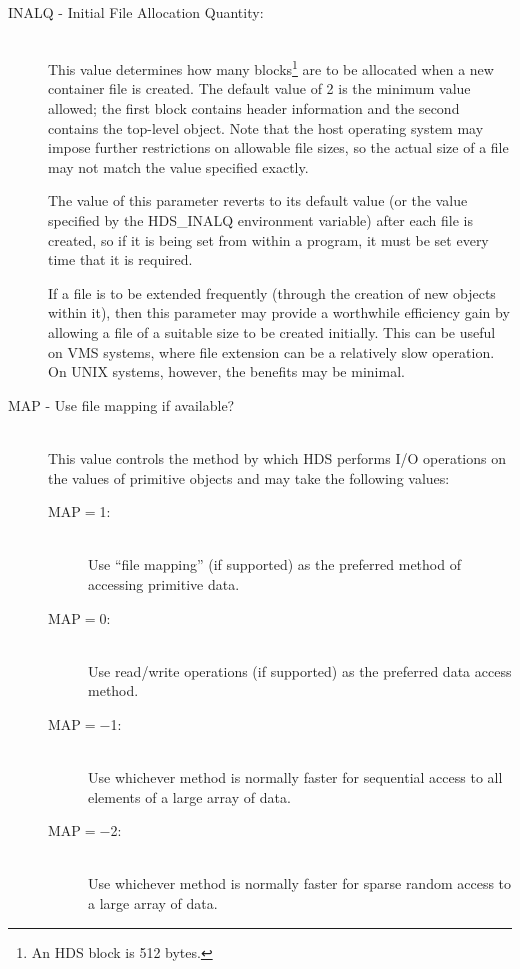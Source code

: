 \begin{description}

\item [INALQ - Initial File Allocation Quantity:]\mbox{}\\
This value determines how many blocks\footnote{An HDS block is 512 bytes.} are
to be allocated when a new container file is created. The default value of 2 is
the minimum value allowed; the first block contains header information and the
second contains the top-level object. Note that the host operating system may
impose further restrictions on allowable file sizes, so the actual size of a
file may not match the value specified exactly.

The value of this parameter reverts to its default value (or the value specified
by the HDS\_INALQ environment variable) after each file is created, so if it is
being set from within a program, it must be set every time that it is required.

If a file is to be extended frequently (through the creation of new objects
within it), then this parameter may provide a worthwhile efficiency gain by
allowing a file of a suitable size to be created initially. This can be useful
on VMS systems, where file extension can be a relatively slow operation. On UNIX
systems, however, the benefits may be minimal.

\item [MAP - Use file mapping if available?]\mbox{}\\
This value controls the method by which HDS performs I/O operations on the
values of primitive objects and may take the following values:

\begin{description}
\item[MAP$=$1:]\mbox{}\\
Use ``file mapping'' (if supported) as the preferred method of accessing
primitive data.

\item[MAP$=$0:]\mbox{}\\
Use read/write operations (if supported) as the preferred data access method.

\item[MAP$=-$1:]\mbox{}\\
Use whichever method is normally faster for sequential access to all elements of
a large array of data.

\item[MAP$=-$2:]\mbox{}\\
Use whichever method is normally faster for sparse random access to a large
array of data.


\end{description}
\end{description}
